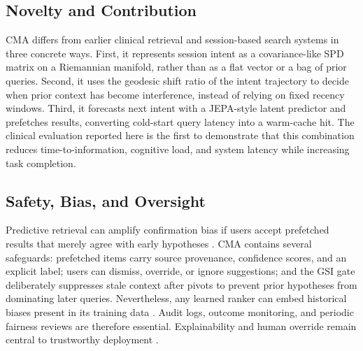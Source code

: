 \documentclass[preprint,12pt]{elsarticle}
\begin{document}
\subsection{Novelty and Contribution}
CMA differs from earlier clinical retrieval and session-based search systems in three concrete ways. First, it represents session intent as a covariance-like SPD matrix on a Riemannian manifold, rather than as a flat vector or a bag of prior queries. Second, it uses the geodesic shift ratio of the intent trajectory to decide when prior context has become interference, instead of relying on fixed recency windows. Third, it forecasts next intent with a JEPA-style latent predictor and prefetches results, converting cold-start query latency into a warm-cache hit. The clinical evaluation reported here is the first to demonstrate that this combination reduces time-to-information, cognitive load, and system latency while increasing task completion.

\subsection{Safety, Bias, and Oversight}
Predictive retrieval can amplify confirmation bias if users accept prefetched results that merely agree with early hypotheses \citep{romeo15}. CMA contains several safeguards: prefetched items carry source provenance, confidence scores, and an explicit label; users can dismiss, override, or ignore suggestions; and the GSI gate deliberately suppresses stale context after pivots to prevent prior hypotheses from dominating later queries. Nevertheless, any learned ranker can embed historical biases present in its training data \citep{hasanzadeh93,chen24}. Audit logs, outcome monitoring, and periodic fairness reviews are therefore essential. Explainability and human override remain central to trustworthy deployment \citep{amann20,lekadir25}.
\end{document}
